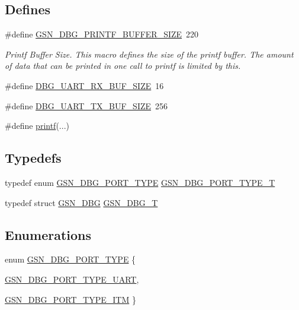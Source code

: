 \subsection*{Defines}
\begin{DoxyCompactItemize}
\item 
\#define \hyperlink{a00480_af26118ea176201539c2c83076cd58a96}{GSN\_\-DBG\_\-PRINTF\_\-BUFFER\_\-SIZE}~220
\begin{DoxyCompactList}\small\item\em Printf Buffer Size. This macro defines the size of the printf buffer. The amount of data that can be printed in one call to printf is limited by this. \end{DoxyCompactList}\item 
\#define \hyperlink{a00480_aba8405c0cf90d3089bbf3f9c245f4c3c}{DBG\_\-UART\_\-RX\_\-BUF\_\-SIZE}~16
\item 
\#define \hyperlink{a00480_ac700db0df52b804c6db3a98ee458770e}{DBG\_\-UART\_\-TX\_\-BUF\_\-SIZE}~256
\item 
\#define \hyperlink{a00480_ad2eb277496af160238e7306fff780ad2}{printf}(...)
\end{DoxyCompactItemize}
\subsection*{Typedefs}
\begin{DoxyCompactItemize}
\item 
typedef enum \hyperlink{a00480_a8ff8c69b7acf278f10a03c109b02e54b}{GSN\_\-DBG\_\-PORT\_\-TYPE} \hyperlink{a00480_a42632950cffc518e7b58d4661584b8a9}{GSN\_\-DBG\_\-PORT\_\-TYPE\_\-T}
\item 
typedef struct \hyperlink{a00042}{GSN\_\-DBG} \hyperlink{a00480_a4920ef5c327fa0df103c11fe6abd0ca4}{GSN\_\-DBG\_\-T}
\end{DoxyCompactItemize}
\subsection*{Enumerations}
\begin{DoxyCompactItemize}
\item 
enum \hyperlink{a00480_a8ff8c69b7acf278f10a03c109b02e54b}{GSN\_\-DBG\_\-PORT\_\-TYPE} \{ \par
\hyperlink{a00480_a8ff8c69b7acf278f10a03c109b02e54baf36171e8e97f9916e2744e1d7cca2c74}{GSN\_\-DBG\_\-PORT\_\-TYPE\_\-UART}, 
\par
\hyperlink{a00480_a8ff8c69b7acf278f10a03c109b02e54baaa35ced24cdd70b9cc95efa3f4228c80}{GSN\_\-DBG\_\-PORT\_\-TYPE\_\-ITM}
 \}
\end{DoxyCompactItemize}
